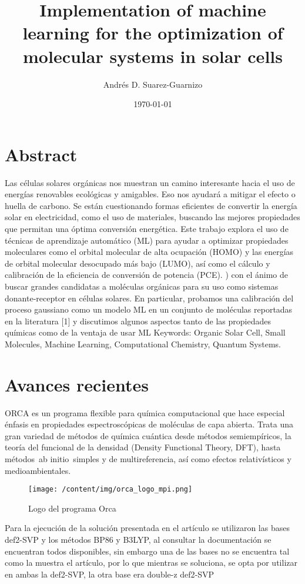 \documentclass{article}%
\title{Implementation of machine learning for the optimization of molecular systems in solar cells}%
\author{Andrés D. Suarez{-}Guarnizo}%
\date{\today}%
\begin{document}
%
\normalsize%
\maketitle%
\section{Abstract}%
\label{sec:Abstract}%
Las células solares orgánicas nos muestran un camino interesante hacia el uso de energías renovables ecológicas y amigables. Eso nos ayudará a mitigar el efecto o huella de carbono. Se están cuestionando formas eficientes de convertir la energía solar en electricidad, como el uso de materiales, buscando las mejores propiedades que permitan una óptima conversión energética. Este trabajo explora el uso de técnicas de aprendizaje automático (ML) para ayudar a optimizar propiedades moleculares como el orbital molecular de alta ocupación (HOMO) y las energías de orbital molecular desocupado más bajo (LUMO), así como el cálculo y calibración de la eficiencia de conversión de potencia (PCE). ) con el ánimo de buscar grandes candidatas a moléculas orgánicas para su uso como sistemas donante{-}receptor en células solares. En particular, probamos una calibración del proceso gaussiano como un modelo ML en un conjunto de moléculas reportadas en la literatura {[}1{]} y discutimos algunos aspectos tanto de las propiedades químicas como de la ventaja de usar ML%
Keywords: Organic Solar Cell, Small Molecules, Machine Learning, Computational Chemistry, Quantum Systems.

%
\section{Avances recientes}%
\label{sec:Avancesrecientes}%
ORCA es un programa flexible para química computacional que hace especial énfasis en propiedades espectroscópicas de moléculas de capa abierta. Trata una gran variedad de métodos de química cuántica desde métodos semiempíricos, la teoría del funcional de la densidad (Density Functional Theory, DFT), hasta métodos~ab initio~simples y de multireferencia, así como efectos relativísticos y medioambientales.%


\begin{figure}[H]%
\centering%
\texttt{[image: /content/img/orca\_logo\_mpi.png]}%
\caption{Logo del programa Orca}%
\end{figure}

%
Para la ejecución de la solución presentada en el artículo se utilizaron las bases def2{-}SVP y los métodos BP86 y B3LYP, al consultar la documentación se encuentran todos disponibles, sin embargo una de las bases no se encuentra tal como la muestra el artículo, por lo que mientras se soluciona, se opta por utilizar en ambas la def2{-}SVP, la otra base era double{-}z def2{-}SVP%
\end{document}
